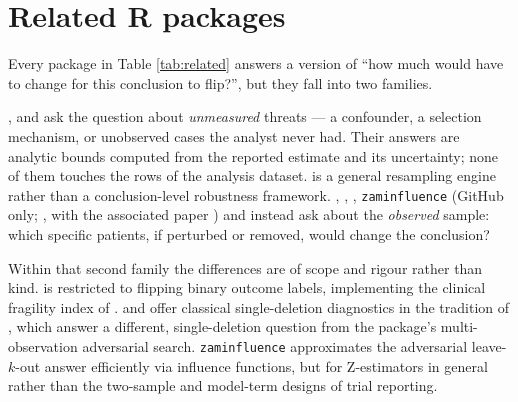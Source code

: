 \section{Related R packages}\label{related-r-packages}

Every package in Table \ref{tab:related} answers a version of ``how much would
have to change for this conclusion to flip?'', but they fall into two families.

 \citep{cinelli2020, cinelli2024sensemakr},
 \citep{rosenberg2025konfound} and 
\citep{vanderweele2017evalue}
ask the question about \emph{unmeasured} threats --- a confounder, a selection
mechanism, or unobserved cases the analyst never had. Their answers are
analytic bounds computed from the reported estimate and its uncertainty; none
of them touches the rows of the analysis dataset. 
\citep{canty2025boot} is a general resampling engine rather than a conclusion-level
robustness framework. 
\citep{lin2025fragility},  \citep{nieuwenhuis2012influenceme},
 \citep{fox2019car}, \texttt{zaminfluence} (GitHub only; \citet{giordano2026zaminfluence},
with the associated paper \citet{broderick2023}) and  instead ask about the
\emph{observed} sample: which specific patients, if perturbed or removed, would
change the conclusion?

Within that second family the differences are of scope and rigour rather than
kind.  is restricted to flipping binary outcome labels, implementing
the clinical fragility index of \citet{walsh2014}.  and 
offer classical single-deletion diagnostics in the tradition of \citet{cook1977},
which answer a different, single-deletion question from the package's
multi-observation adversarial search. \texttt{zaminfluence}
approximates the adversarial leave-\(k\)-out answer efficiently via influence
functions, but for Z-estimators in general rather than the two-sample and
model-term designs of trial reporting.

